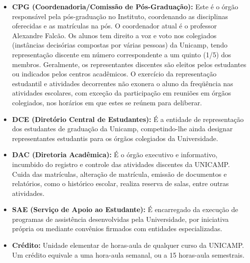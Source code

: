 \documentclass[a4paper,10pt, twocolumn]{article}
\begin{document}
\begin{itemize}
\item  \textbf{CPG (Coordenadoria/Comissão de Pós-Graduação):} Este é o órgão responsável pela pós-graduação no Instituto, coordenando as disciplinas oferecidas e as matrículas na pós. O coordenador atual é o professor Alexandre Falcão. Os alunos tem direito a voz e voto nos colegiados (instâncias decisórias compostas por várias pessoas) da Unicamp, tendo representação discente em número correspondente a um quinto (1/5) dos membros. Geralmente, os representantes discentes são eleitos pelos estudantes ou indicados pelos centros acadêmicos. O exercício da representação estudantil e atividades decorrentes não exonera o aluno da freqüência nas atividades escolares, com exceção da participação em reuniões em órgãos colegiados, nos horários em que estes se reúnem para deliberar.
\end{itemize}

\begin{itemize}
\item  \textbf{DCE (Diretório Central de Estudantes):} É a entidade de representação dos estudantes de graduação da Unicamp, competindo-lhe ainda designar representantes estudantis para os órgãos colegiados da Universidade.
\end{itemize}

\begin{itemize}
\item  \textbf{DAC (Diretoria Acadêmica):} É o órgão executivo e informativo, incumbido do registro e controle das atividades discentes da UNICAMP. Cuida das matrículas, alteração de matrícula, emissão de documentos e relatórios, como o histórico escolar, realiza reserva de salas, entre outras atividades.
\end{itemize}

\begin{itemize}
\item  \textbf{SAE (Serviço de Apoio ao Estudante):} É encarregado da execução de programas de assistência desenvolvidas pela Universidade, por iniciativa própria ou mediante convênios firmados com entidades especializadas.
\end{itemize}

\begin{itemize}
\item  \textbf{Crédito:} Unidade elementar de horas-aula de qualquer curso da UNICAMP. Um crédito equivale a uma hora-aula semanal, ou a 15 horas-aula semestrais.
\end{itemize}
\end{document}
